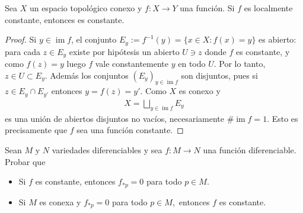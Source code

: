 \documentclass[11pt]{article}
\newcommand{\im}{\operatorname{im}}
\newcommand{\paint}[2]{\color{#1}{#2}}
\newenvironment{exercise}[2][Ejercicio]{\begin{trivlist}
\item[\hskip \labelsep \paint{red}{{\bfseries #1}}\hskip \labelsep {\bfseries #2.}]}{\end{trivlist}}
\newenvironment{proposition}[2][Proposici\'on]{\begin{trivlist}
\item[\hskip \labelsep \paint{red}{{\bfseries #1.}}]}{\end{trivlist}}
\begin{document}
\begin{proposition}{} Sea $X$ un espacio topol\'ogico conexo y  $f : X \to Y$ una funci\'on. Si $f$ es localmente constante, entonces es constante.
\end{proposition}
\begin{proof} Si $y \in \im f$, el conjunto $E_y := f^{-1}(y) = \{x \in X : f(x) = y\}$ es abierto: para cada $z \in E_y$ existe por hip\'otesis un abierto $U \ni z$ donde $f$ es constante, y como $f(z) = y$ luego $f$ vale constantemente $y$ en todo $U$. Por lo tanto, $z \in U \subset E_y$. Adem\'as los conjuntos $(E_y)_{y \in \im f}$ son disjuntos, pues si $z \in E_y \cap E_{y'}$ entonces $y = f(z) = y'$. Como $X$ es conexo y
\begin{align*}
X = \bigsqcup_{y \in \im f}E_y
\end{align*}
es una uni\'on de abiertos disjuntos no vac\'ios, necesariamente $\#\im f = 1$. Esto es precisamente que $f$ sea una funci\'on constante. 
\end{proof}

\begin{exercise}{12} Sean $M$ y $N$ variedades diferenciables y sea $f:M\to N$ una funci\'on diferenciable. Probar que
\begin{itemize}
\item Si $f$ es constante, entonces $f_{\ast p}=0$ para todo $p\in M$.

\item Si $M$ es conexa y $f_{\ast p}=0$ para todo $p\in M,$ entonces $f$ es
constante.
\end{itemize}
\end{exercise}
\end{document}

